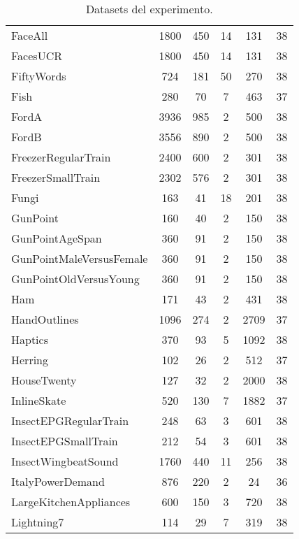 \begin{table}[htbp]
\begin{tabular}{||l c c c c c||}
 FaceAll & 1800 & 450 & 14 & 131 & 38 \\
 FacesUCR & 1800 & 450 & 14 & 131 & 38 \\
 FiftyWords & 724 & 181 & 50 & 270 & 38 \\
 Fish & 280 & 70 & 7 & 463 & 37 \\
 FordA & 3936 & 985 & 2 & 500 & 38 \\
 FordB & 3556 & 890 & 2 & 500 & 38 \\
 FreezerRegularTrain & 2400 & 600 & 2 & 301 & 38 \\
 FreezerSmallTrain & 2302 & 576 & 2 & 301 & 38 \\
 Fungi & 163 & 41 & 18 & 201 & 38 \\
 GunPoint & 160 & 40 & 2 & 150 & 38 \\
 GunPointAgeSpan & 360 & 91 & 2 & 150 & 38 \\
 GunPointMaleVersusFemale & 360 & 91 & 2 & 150 & 38 \\
 GunPointOldVersusYoung & 360 & 91 & 2 & 150 & 38 \\
 Ham & 171 & 43 & 2 & 431 & 38 \\
 HandOutlines & 1096 & 274 & 2 & 2709 & 37 \\
 Haptics & 370 & 93 & 5 & 1092 & 38 \\
 Herring & 102 & 26 & 2 & 512 & 37 \\
 HouseTwenty & 127 & 32 & 2 & 2000 & 38 \\
 InlineSkate & 520 & 130 & 7 & 1882 & 37 \\
 InsectEPGRegularTrain & 248 & 63 & 3 & 601 & 38 \\
 InsectEPGSmallTrain & 212 & 54 & 3 & 601 & 38 \\
 InsectWingbeatSound & 1760 & 440 & 11 & 256 & 38 \\
 ItalyPowerDemand & 876 & 220 & 2 & 24 & 36 \\
 LargeKitchenAppliances & 600 & 150 & 3 & 720 & 38 \\
 Lightning7 & 114 & 29 & 7 & 319 & 38 \\ [1ex]
 \hline
\end{tabular}
\caption{Datasets del experimento.}
\label{table:pv-datasets1}
\end{table}


